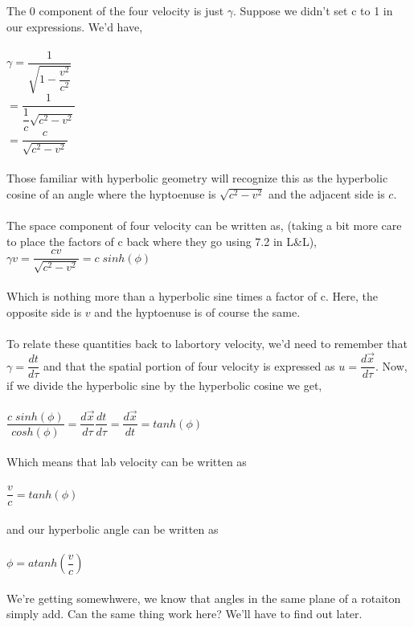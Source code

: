\documentclass[prb,preprint]
{revtex4-1}
\begin{document}
\\
\\
The 0 component of the four velocity is just $\gamma$.  Suppose we didn't set c to 1 in our expressions.  We'd have,
\\
\\
$\gamma = \dfrac{1}{\sqrt{1 - \dfrac{v^2}{c^2}}}$
\\
$= \dfrac{1}{\dfrac{1}{c}\sqrt{c^2 - v^2}}$
\\
$= \dfrac{c}{\sqrt{c^2 - v^2}}$
\\
\\
Those familiar with hyperbolic geometry will recognize this as the hyperbolic cosine of an angle where the hyptoenuse is $\sqrt{c^2 - v^2}$ and the adjacent side is $c$.
\\
\\
The space component of four velocity can be written as, (taking a bit more care to place the factors of c back where they go using 7.2 in L\&L),
\\
$\gamma v = \dfrac{cv}{\sqrt{c^2 - v^2}} = c\;sinh\left(\phi\right)$
\\
\\
Which is nothing more than a hyperbolic sine times a factor of c.  Here, the opposite side is $v$ and the hyptoenuse is of course the same.
\\
\\
To relate these quantities back to labortory velocity, we'd need to remember that $\gamma = \dfrac{dt}{d\tau}$ and that the spatial portion of four velocity is expressed as $u = \dfrac{d\vec{x}}{d\tau}$.  Now, if we divide the hyperbolic sine by the hyperbolic cosine we get, 
\\
\\
$\dfrac{c\;sinh\left(\phi\right)}{cosh\left(\phi\right)} = \dfrac{d\vec{x}}{d\tau} \dfrac{dt}{d\tau} = \dfrac{d\vec{x}}{dt} = tanh\left(\phi\right)$
\\
\\
Which means that lab velocity can be written as
\\
\\
$\dfrac{v}{c} = tanh\left(\phi\right)$
\\
\\
and our hyperbolic angle can be written as 
\\
\\
$\phi = atanh\left(\dfrac{v}{c}\right)$
\\
\\
We're getting somewhwere, we know that angles in the same plane of a rotaiton simply add.  Can the same thing work here?  We'll have to find out later.
\end{document}
